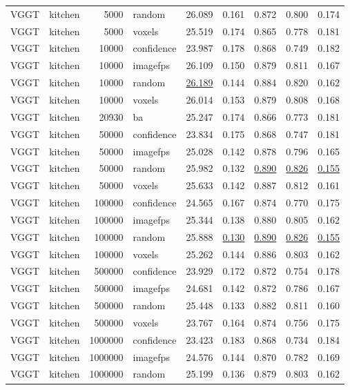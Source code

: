 \begin{table}[H]
\begin{tabular}{llrlrrrrr}
VGGT & kitchen & 5000 & random & 26.089 & 0.161 & 0.872 & 0.800 & 0.174 \\
VGGT & kitchen & 5000 & voxels & 25.519 & 0.174 & 0.865 & 0.778 & 0.181 \\
VGGT & kitchen & 10000 & confidence & 23.987 & 0.178 & 0.868 & 0.749 & 0.182 \\
VGGT & kitchen & 10000 & imagefps & 26.109 & 0.150 & 0.879 & 0.811 & 0.167 \\
VGGT & kitchen & 10000 & random & \underline{26.189} & 0.144 & 0.884 & 0.820 & 0.162 \\
VGGT & kitchen & 10000 & voxels & 26.014 & 0.153 & 0.879 & 0.808 & 0.168 \\
VGGT & kitchen & 20930 & ba & 25.247 & 0.174 & 0.866 & 0.773 & 0.181 \\
VGGT & kitchen & 50000 & confidence & 23.834 & 0.175 & 0.868 & 0.747 & 0.181 \\
VGGT & kitchen & 50000 & imagefps & 25.028 & 0.142 & 0.878 & 0.796 & 0.165 \\
VGGT & kitchen & 50000 & random & 25.982 & 0.132 & \underline{0.890} & \underline{0.826} & \underline{0.155} \\
VGGT & kitchen & 50000 & voxels & 25.633 & 0.142 & 0.887 & 0.812 & 0.161 \\
VGGT & kitchen & 100000 & confidence & 24.565 & 0.167 & 0.874 & 0.770 & 0.175 \\
VGGT & kitchen & 100000 & imagefps & 25.344 & 0.138 & 0.880 & 0.805 & 0.162 \\
VGGT & kitchen & 100000 & random & 25.888 & \underline{0.130} & \underline{0.890} & \underline{0.826} & \underline{0.155} \\
VGGT & kitchen & 100000 & voxels & 25.262 & 0.144 & 0.886 & 0.803 & 0.162 \\
VGGT & kitchen & 500000 & confidence & 23.929 & 0.172 & 0.872 & 0.754 & 0.178 \\
VGGT & kitchen & 500000 & imagefps & 24.681 & 0.142 & 0.872 & 0.786 & 0.167 \\
VGGT & kitchen & 500000 & random & 25.448 & 0.133 & 0.882 & 0.811 & 0.160 \\
VGGT & kitchen & 500000 & voxels & 23.767 & 0.164 & 0.874 & 0.756 & 0.175 \\
VGGT & kitchen & 1000000 & confidence & 23.423 & 0.183 & 0.868 & 0.734 & 0.184 \\
VGGT & kitchen & 1000000 & imagefps & 24.576 & 0.144 & 0.870 & 0.782 & 0.169 \\
VGGT & kitchen & 1000000 & random & 25.199 & 0.136 & 0.879 & 0.803 & 0.162 \\

\end{tabular}
\end{table}
